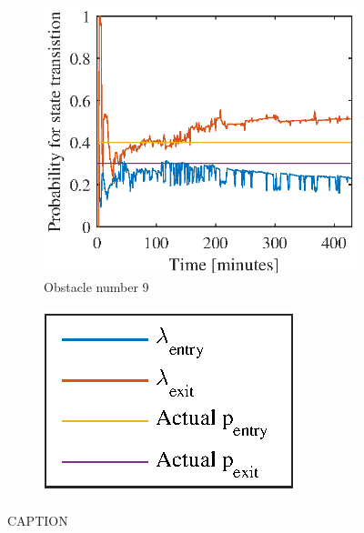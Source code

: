 \begin{figure}[htbp]
	\begin{subfigure}[t]{0.5\linewidth}
		\centering
		\includegraphics[width=1\linewidth]{chapters/appendix/figures/learning_curves/obs9}
		\caption{Obstacle number 9}
	\end{subfigure}
	\hspace*{\fill}
	\begin{subfigure}[t]{0.5\linewidth}
		\centering
		\includegraphics[scale = 1]{chapters/appendix/figures/learning_curves/legend}
	\end{subfigure}

	\caption{CAPTION}
	\label{fig:all_learnings_sim_2}
\end{figure}